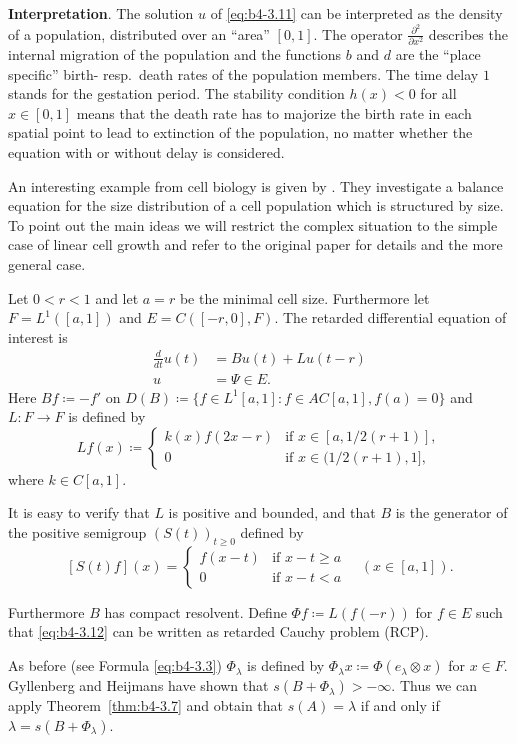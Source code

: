 \noindent
\textbf{Interpretation}.\quad
	The solution $u$ of \eqref{eq:b4-3.11} can be interpreted as the density of a population, distributed over an \enquote{area} $[0,1]$.
	The operator $\frac{\partial^2}{\partial x^2}$ describes the internal migration of the population and the functions $b$ and $d$ are the \enquote{place specific} birth- resp.\ death rates of the population members. 
	The time delay $1$ stands for the gestation period. 
	The stability condition $h(x) < 0$ for all $x \in [0,1]$ means that the death rate has to majorize the birth rate in each spatial point to lead to extinction of the population, no matter whether the equation with or without delay is considered.

\begin{example}\label{ex:b4-3.12}
	An interesting example from cell biology is given by \citet{gyllenbergheijmans:1985}. 
	They investigate a balance equation for the size distribution of a cell population which is structured by size. 
	To point out the main ideas we will restrict the complex situation to the simple case of linear cell growth and refer to the original paper for details and the more general case.
	
	Let $0 < r < 1$ and let $a = r$ be the minimal cell size. 
	Furthermore let $F = L^1([a,1])$ and $E = C([-r,0],F)$. 
	The retarded differential equation of interest is 
	\begin{equation}\label{eq:b4-3.12}
			\begin{aligned}
		\frac{d}{dt}u(t) &= Bu(t) + Lu(t-r)\\
		u &= \Psi \in E.
		\end{aligned}
	\end{equation}
%
%
Here $Bf  \coloneq  -f'$ on $D(B) \coloneq \{f \in L^1[a,1] \colon f \in AC[a,1], f(a) = 0\}$ and $L : F \to F$ is defined by
\[
Lf(x) \coloneq 
\begin{cases}
	k(x)f(2x-r) & \text{if } x \in [a,1/2(r+1)] , \\
	0 & \text{if } x \in (1/2(r+1),1] ,
\end{cases}
\]
where $k \in C[a,1]$.

It is easy to verify that $L$ is positive and bounded, and that $B$ is the generator of the positive semigroup $(S(t))_{t\geq0}$ defined by
\[
[S(t)f](x) = 
\begin{cases}
	f(x-t) & \text{if } x-t \geq a \\
	0 & \text{if } x-t < a
\end{cases}
\quad (x \in [a,1]).
\]

Furthermore $B$ has compact resolvent. 
Define $\Phi f  \coloneq  L(f(-r))$ for $f \in E$ such that \eqref{eq:b4-3.12} can be written as retarded Cauchy problem (RCP).

As before (see Formula \eqref{eq:b4-3.3}) $\Phi_{\lambda}$ is defined by $\Phi_{\lambda}x  \coloneq  \Phi(e_{\lambda}\otimes x)$ for $x \in F$. 
Gyllenberg and Heijmans have shown that $s(B + \Phi_{\lambda}) > -\infty$. 
Thus we can apply Theorem~\ref{thm:b4-3.7} and obtain that $s(A) = \lambda$ if and only if $\lambda = s(B + \Phi_{\lambda})$.
\end{example}

